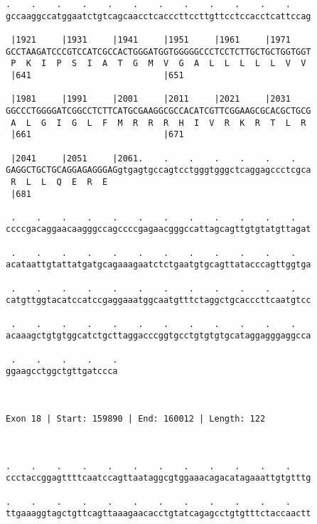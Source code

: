\documentclass{article}
\begin{document}
\begin{Verbatim}
.    .    .    .    .    .    .    .    .    .    .    .    
gccaaggccatggaatctgtcagcaacctcacccttccttgttcctccacctcattccag
                                                            
 |1921     |1931     |1941     |1951     |1961     |1971    
GCCTAAGATCCCGTCCATCGCCACTGGGATGGTGGGGGCCCTCCTCTTGCTGCTGGTGGT
 P  K  I  P  S  I  A  T  G  M  V  G  A  L  L  L  L  L  V  V 
 |641                          |651                         
  
 |1981     |1991     |2001     |2011     |2021     |2031    
GGCCCTGGGGATCGGCCTCTTCATGCGAAGGCGCCACATCGTTCGGAAGCGCACGCTGCG
 A  L  G  I  G  L  F  M  R  R  R  H  I  V  R  K  R  T  L  R 
 |661                          |671                         
  
 |2041     |2051     |2061.    .    .    .    .    .    .   
GAGGCTGCTGCAGGAGAGGGAGgtgagtgccagtcctgggtgggctcaggagccctcgca
 R  L  L  Q  E  R  E                                        
 |681                                                       
  
 .    .    .    .    .    .    .    .    .    .    .    .   
ccccgacaggaacaagggccagccccgagaacgggccattagcagttgtgtatgttagat
                                                            
 .    .    .    .    .    .    .    .    .    .    .    .   
acataattgtattatgatgcagaaagaatctctgaatgtgcagttatacccagttggtga
                                                            
 .    .    .    .    .    .    .    .    .    .    .    .   
catgttggtacatccatccgaggaaatggcaatgtttctaggctgcacccttcaatgtcc
                                                            
 .    .    .    .    .    .    .    .    .    .    .    .   
acaaagctgtgtggcatctgcttaggacccggtgcctgtgtgtgcataggagggaggcca
                                                            
 .    .    .    .    .
ggaagcctggctgttgatccca
                      
                      
 
Exon 18 | Start: 159890 | End: 160012 | Length: 122



.    .    .    .    .    .    .    .    .    .    .    .    
ccctaccggagttttcaatccagttaataggcgtggaaacagacatagaaattgtgtttg
                                                            
.    .    .    .    .    .    .    .    .    .    .    .    
ttgaaaggtagctgttcagttaaagaacacctgtatcagagcctgtgtttctaccaactt
                                                            

\end{Verbatim}
\end{document}
